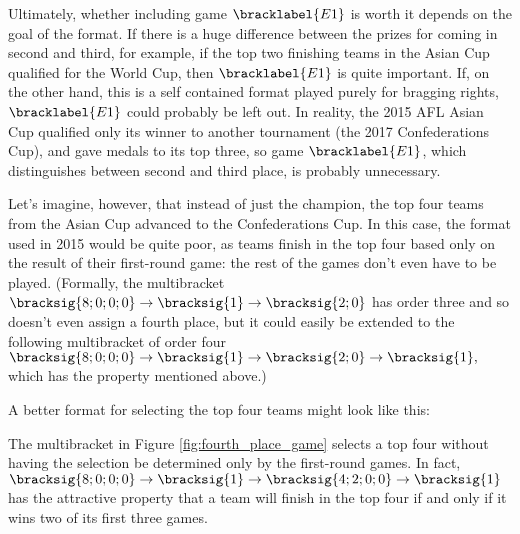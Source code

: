 {    Ultimately, whether including game $\bracklabel{E1}$ is worth it depends on the goal of the format. If there is a huge difference between the prizes for coming in second and third, for example, if the top two finishing teams in the Asian Cup qualified for the World Cup, then $\bracklabel{E1}$ is quite important. If, on the other hand, this is  a self contained format played purely for bragging rights, $\bracklabel{E1}$ could probably be left out. In reality, the 2015 AFL Asian Cup qualified only its winner to another tournament (the 2017 Confederations Cup), and gave medals to its top three, so game $\bracklabel{E1}$, which distinguishes between second and third place, is probably unnecessary.

    Let's imagine, however, that instead of just the champion, the top four teams from the Asian Cup advanced to the Confederations Cup. In this case, the format used in 2015 would be quite poor, as teams finish in the top four based only on the result of their first-round game: the rest of the games don't even have to be played. (Formally, the multibracket $\bracksig{8;0;0;0} \to \bracksig{1} \to \bracksig{2; 0}$ has order three and so doesn't even assign a fourth place, but it could easily be extended to the following multibracket of order four $\bracksig{8;0;0;0} \to \bracksig{1} \to \bracksig{2; 0} \to \bracksig{1},$ which has the property mentioned above.)
    
    A better format for selecting the top four teams might look like this:


    The multibracket in Figure \ref{fig:fourth_place_game} selects a top four without having the selection be determined only by the first-round games. In fact, $\bracksig{8;0;0;0} \to \bracksig{1} \to \bracksig{4; 2; 0; 0} \to \bracksig{1}$ has the attractive property that a team will finish in the top four if and only if it wins two of its first three games.
}